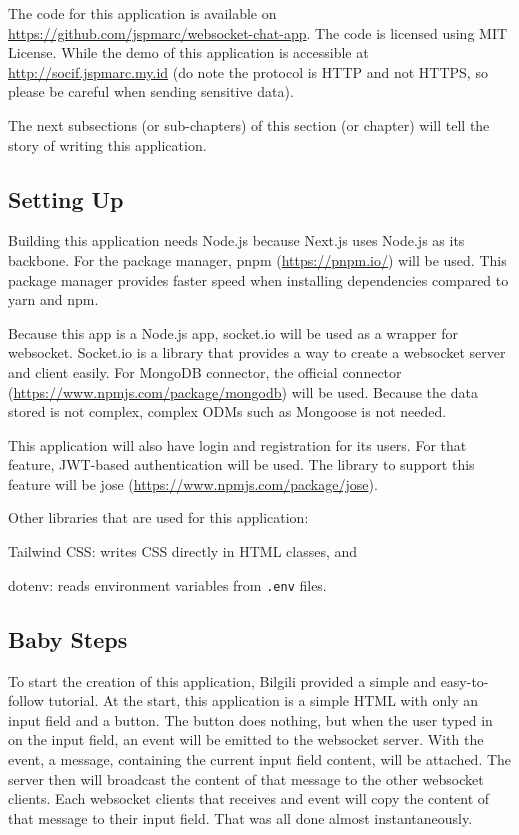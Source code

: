 \documentclass[conference]{IEEEtran}
\begin{document}
The code for this application is available on
\url{https://github.com/jspmarc/websocket-chat-app}. The code is licensed using MIT
License. While the demo of this application is accessible at
\url{http://socif.jspmarc.my.id} (do note the protocol is HTTP and not HTTPS, so
please be careful when sending sensitive data).

The next subsections (or sub-chapters) of this section (or chapter) will tell the
story of writing this application.

\subsection{Setting Up}

Building this application needs Node.js because Next.js uses Node.js as its backbone.
For the package manager, pnpm (\url{https://pnpm.io/}) will be used. This package
manager provides faster speed when installing dependencies compared to yarn and npm.

Because this app is a Node.js app, socket.io will be used as a wrapper for websocket.
Socket.io is a library that provides a way to create a websocket server and client
easily. For MongoDB connector, the official connector (\url{https://www.npmjs.com/package/mongodb})
will be used. Because the data stored is not complex, complex ODMs such as Mongoose is
not needed.

This application will also have login and registration for its users. For that feature,
JWT-based authentication will be used. The library to support this feature will be
jose (\url{https://www.npmjs.com/package/jose}).

Other libraries that are used for this application:
\begin{IEEEitemize}
    \item{Tailwind CSS}: writes CSS directly in HTML classes, and
    \item{dotenv}: reads environment variables from \texttt{.env} files.
\end{IEEEitemize}

\subsection{Baby Steps}\label{baby-steps}

To start the creation of this application, Bilgili \cite{b3} provided a simple
and easy-to-follow tutorial. At the start, this application is a simple HTML with
only an input field and a button. The button does nothing, but when the user typed in
on the input field, an event will be emitted to the websocket server. With the event,
a message, containing the current input field content, will be attached. The server then
will broadcast the content of that message to the other websocket clients. Each
websocket clients that receives and event will copy the content of that message to their
input field. That was all done almost instantaneously.
\end{document}
